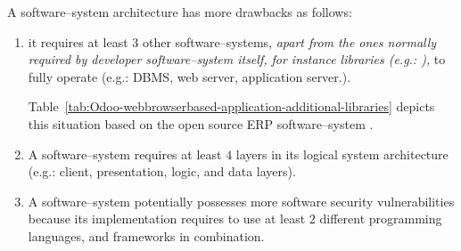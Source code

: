 A \webbrowserbased software--system
architecture has more drawbacks as
follows:

\begin{enumerate}[1.]
	\item it requires at least $3$ other 
		software--systems, \emph{apart from
		the ones normally required by developer
		software--system itself, for instance libraries (e.g.:
		\logFourJ),} to fully operate
		(e.g.: DBMS, web server, application server.).
		
		Table~\ref{tab:Odoo-webbrowserbased-application-additional-libraries}
		depicts this situation based on the open source ERP
		software--system \Odoo.		
				
	\item A \webbrowserbased software--system
		requires at least $4$ layers in
		its logical system architecture
		(e.g.: client, presentation, logic,
		and data layers).

	\item A \webbrowserbased software--system
		potentially possesses more software
		security vulnerabilities because its
		implementation requires to use at least
		$2$ different programming languages, and
		frameworks in combination.
\end{enumerate}

